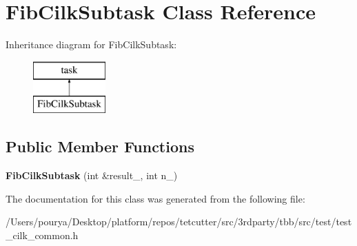 \hypertarget{classFibCilkSubtask}{}\section{Fib\+Cilk\+Subtask Class Reference}
\label{classFibCilkSubtask}
Inheritance diagram for Fib\+Cilk\+Subtask\+:\begin{figure}[H]
\begin{center}
\leavevmode
\includegraphics[height=2.000000cm]{classFibCilkSubtask}
\end{center}
\end{figure}
\subsection*{Public Member Functions}
\begin{DoxyCompactItemize}
\item 
\hypertarget{classFibCilkSubtask_a33b42d6b69e7e07a6d9707ede973a164}{}{\bfseries Fib\+Cilk\+Subtask} (int \&result\+\_\+, int n\+\_\+)\label{classFibCilkSubtask_a33b42d6b69e7e07a6d9707ede973a164}

\end{DoxyCompactItemize}


The documentation for this class was generated from the following file\+:\begin{DoxyCompactItemize}
\item 
/\+Users/pourya/\+Desktop/platform/repos/tetcutter/src/3rdparty/tbb/src/test/test\+\_\+cilk\+\_\+common.\+h\end{DoxyCompactItemize}
